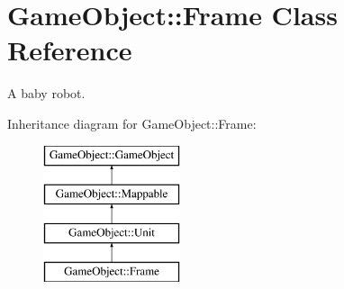 \hypertarget{classGameObject_1_1Frame}{
\section{GameObject::Frame Class Reference}
\label{classGameObject_1_1Frame}
}


A baby robot.  


Inheritance diagram for GameObject::Frame:\begin{figure}[H]
\begin{center}
\leavevmode
\includegraphics[height=4cm]{classGameObject_1_1Frame}
\end{center}
\end{figure}
